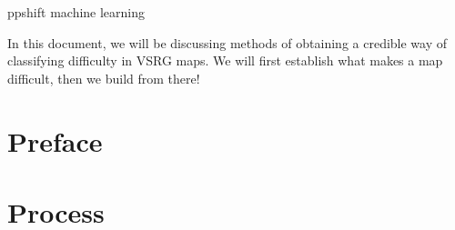 \documentclass{article}
\begin{document}
	ppshift machine learning
	
	In this document, we will be discussing methods of obtaining a credible way of classifying difficulty in VSRG maps. We will first establish what makes a map difficult, then we build from there!
	
\part{Preface}




\part{Process}






\end{document}
